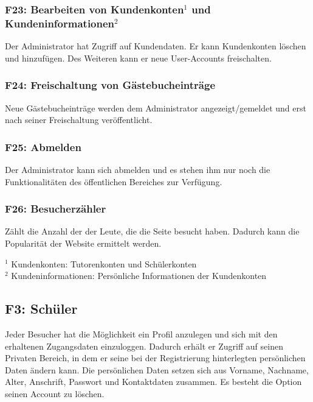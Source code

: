 \documentclass[10pt,a4paper]{scrartcl}
\begin{document}
\subsubsection*{F23: Bearbeiten von Kundenkonten$^1$ und Kundeninformationen$^2$}

Der Administrator hat Zugriff auf Kundendaten. Er kann Kundenkonten löschen und hinzufügen. Des Weiteren kann er neue User-Accounts freischalten.

%

\subsubsection*{F24: Freischaltung von Gästebucheinträge}

Neue Gästebucheinträge werden dem Administrator angezeigt/gemeldet und erst nach seiner Freischaltung veröffentlicht.

\subsubsection*{F25: Abmelden}

Der Administrator kann sich abmelden und es stehen ihm nur noch die Funktionalitäten des öffentlichen Bereiches zur Verfügung.

\subsubsection*{F26: Besucherzähler}

Zählt die Anzahl der der Leute, die die Seite besucht haben. Dadurch kann die Popularität der Website ermittelt werden.
\bigskip

$^1$ Kundenkonten: Tutorenkonten und Schülerkonten\\
$^2$ Kundeninformationen: Persönliche Informationen der Kundenkonten




\subsection{F3: Schüler}
Jeder Besucher hat die Möglichkeit ein Profil anzulegen und sich mit den erhaltenen Zugangsdaten einzuloggen.
Dadurch erhält er Zugriff auf seinen Privaten Bereich, in dem er seine bei der Registrierung hinterlegten persönlichen Daten ändern kann.
Die persönlichen Daten setzen sich aus Vorname, Nachname, Alter, Anschrift, Passwort und Kontaktdaten zusammen.
Es besteht die Option seinen Account zu löschen.
\end{document}
